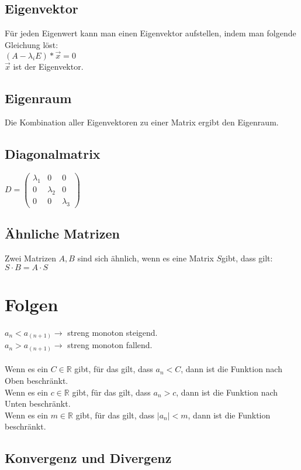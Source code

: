\documentclass[a4paper,landscape, 11pt]{article}
\begin{document}
\begin{multicols}{4}
\begin{small}
        \subsection{Eigenvektor}
        Für jeden Eigenwert kann man einen Eigenvektor aufstellen, indem man folgende Gleichung löst: \\
        $ (A - \lambda_iE)*\vec{x} = 0$\\
        $\vec{x}$ ist der Eigenvektor.
        
        \subsection{Eigenraum}
        Die Kombination aller Eigenvektoren zu einer Matrix ergibt den Eigenraum.
        \subsection{Diagonalmatrix}
        $D=\begin{pmatrix}
        \lambda_1 & 0 & 0 \\
        0 & \lambda_2 & 0 \\
        0 & 0 & \lambda_3 
        \end{pmatrix}$
        \subsection{Ähnliche Matrizen}
        Zwei Matrizen $A, B$ sind sich ähnlich, wenn es eine Matrix $S$gibt, dass gilt: \\
        $S\cdot B = A \cdot S$
    \section{Folgen}
    $a_n < a_(n+1) \rightarrow$ streng monoton steigend. \\
    $a_n > a_(n+1) \rightarrow$ streng monoton fallend. \\ 
    \\ 
    Wenn es ein $C \in \mathbb{R}$ gibt, für das gilt, dass $a_n < C$, dann ist die Funktion nach Oben beschränkt. \\
    Wenn es ein $c \in \mathbb{R}$ gibt, für das gilt, dass $a_n > c$, dann ist die Funktion nach Unten beschränkt. \\
    Wenn es ein $m \in \mathbb{R}$ gibt, für das gilt, dass $ | a_n | < m$, dann ist die Funktion beschränkt.
        
        \subsection{Konvergenz und Divergenz}
            

\end{small}
\end{multicols}
\end{document}
